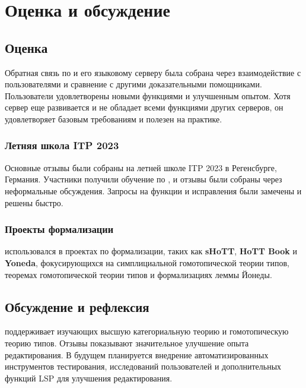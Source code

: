 \chapter{Оценка и обсуждение}
\label{chap:eval}

\section{Оценка}

Обратная связь по \Rzk{} и его языковому серверу была собрана через взаимодействие с пользователями и сравнение с другими доказательными помощниками. Пользователи удовлетворены новыми функциями и улучшенным опытом. Хотя сервер еще развивается и не обладает всеми функциями других серверов, он удовлетворяет базовым требованиям и полезен на практике.

\subsection{Летняя школа ITP 2023}

Основные отзывы были собраны на летней школе ITP 2023 в Регенсбурге, Германия. Участники получили обучение по \Rzk{}, и отзывы были собраны через неформальные обсуждения. Запросы на функции и исправления были замечены и решены быстро.

\subsection{Проекты формализации}

\Rzk{} использовался в проектах по формализации, таких как \textbf{sHoTT}, \textbf{HoTT Book} и \textbf{Yoneda}, фокусирующихся на симплициальной гомотопической теории типов, теоремах гомотопической теории типов и формализациях леммы Йонеды.

\section{Обсуждение и рефлексия}

\Rzk{} поддерживает изучающих высшую категориальную теорию и гомотопическую теорию типов. Отзывы показывают значительное улучшение опыта редактирования. В будущем планируется внедрение автоматизированных инструментов тестирования, исследований пользователей и дополнительных функций LSP для улучшения редактирования.
